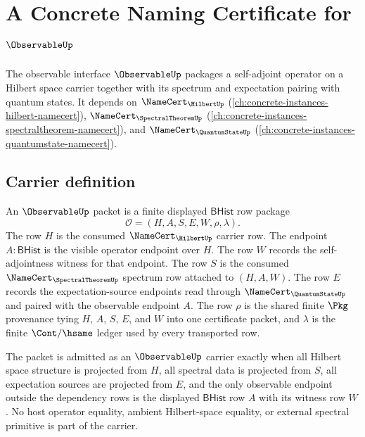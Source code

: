 \chapter{A Concrete Naming Certificate for $\ObservableUp$}
\label{ch:concrete-instances-observable-namecert}

The observable interface $\ObservableUp$ packages a self-adjoint operator on a Hilbert space carrier together with its spectrum and expectation pairing with quantum states. It depends on $\NameCert_{\HilbertUp}$ (\autoref{ch:concrete-instances-hilbert-namecert}), $\NameCert_{\SpectralTheoremUp}$ (\autoref{ch:concrete-instances-spectraltheorem-namecert}), and $\NameCert_{\QuantumStateUp}$ (\autoref{ch:concrete-instances-quantumstate-namecert}).

\section{Carrier definition}
\label{sec:observable-carrier}

\begin{definition}
\label{def:observable-bhist-operator-carrier}
An $\ObservableUp$ packet is a finite displayed $\mathsf{BHist}$ row package
$$
\mathcal{O}=(H,A,S,E,W,\rho,\lambda).
$$
The row $H$ is the consumed $\NameCert_{\HilbertUp}$ carrier row. The endpoint
$A:\mathsf{BHist}$ is the visible operator endpoint over $H$. The row $W$
records the self-adjointness witness for that endpoint. The row $S$ is the
consumed $\NameCert_{\SpectralTheoremUp}$ spectrum row attached to $(H,A,W)$.
The row $E$ records the expectation-source endpoints read through
$\NameCert_{\QuantumStateUp}$ and paired with the observable endpoint $A$. The
row $\rho$ is the shared finite $\Pkg$ provenance tying $H$, $A$, $S$, $E$,
and $W$ into one certificate packet, and $\lambda$ is the finite
$\Cont/\hsame$ ledger used by every transported row.

The packet is admitted as an $\ObservableUp$ carrier exactly when all Hilbert
space structure is projected from $H$, all spectral data is projected from
$S$, all expectation sources are projected from $E$, and the only observable
endpoint outside the dependency rows is the displayed $\mathsf{BHist}$ row
$A$ with its witness row $W$. No host operator equality, ambient Hilbert-space
equality, or external spectral primitive is part of the carrier.
\end{definition}

